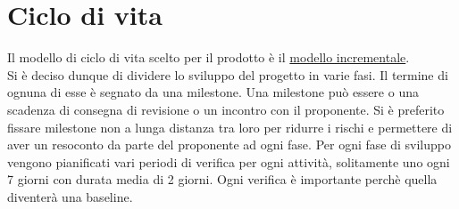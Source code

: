 	\section{Ciclo di vita}
		Il modello di ciclo di vita scelto per il prodotto è il \underline{modello incrementale}.\\Si è deciso dunque di dividere lo sviluppo del progetto in varie fasi. Il termine di ognuna di esse è segnato da una milestone. Una milestone può essere o una scadenza di consegna di revisione o un incontro con il proponente. Si è preferito fissare milestone non a lunga distanza tra loro per ridurre i rischi e permettere di aver un resoconto da parte del proponente ad ogni fase. Per ogni fase di sviluppo vengono pianificati vari periodi di verifica per ogni attività, solitamente uno ogni 7 giorni con durata media di 2 giorni. Ogni verifica è importante perchè quella diventerà una baseline.
